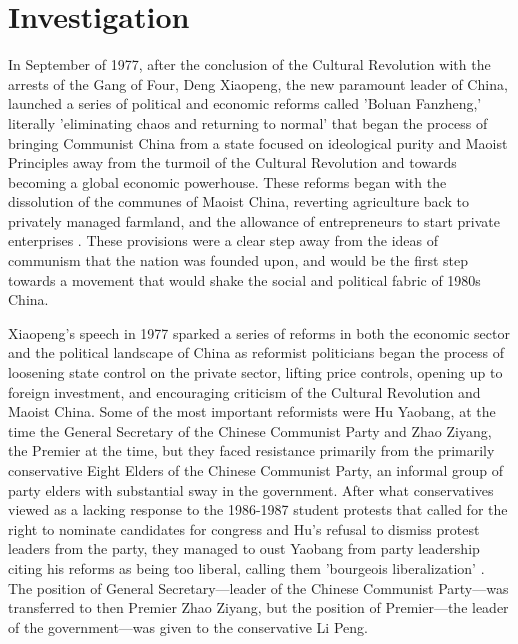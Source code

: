 \documentclass{paper}
\begin{document}
\section{Investigation}
In September of 1977, after the conclusion of the Cultural Revolution with the arrests of the Gang of Four, Deng Xiaopeng, the new paramount leader of China, launched a series of political and economic reforms called 'Boluan Fanzheng,' literally 'eliminating chaos and returning to normal' that began the process of bringing Communist China from a state focused on ideological purity and Maoist Principles away from the turmoil of the Cultural Revolution and towards becoming a global economic powerhouse. These reforms began with the dissolution of the communes of Maoist China, reverting agriculture back to privately managed farmland, and the allowance of entrepreneurs to start private enterprises \cite{reforms}. These provisions were a clear step away from the ideas of communism that the nation was founded upon, and would be the first step towards a movement that would shake the social and political fabric of 1980s China.

Xiaopeng's speech in 1977 sparked a series of reforms in both the economic sector and the political landscape of China as reformist politicians began the process of loosening state control on the private sector, lifting price controls, opening up to foreign investment, and encouraging criticism of the Cultural Revolution and Maoist China. Some of the most important reformists were Hu Yaobang, at the time the General Secretary of the Chinese Communist Party and Zhao Ziyang, the Premier at the time, but they faced resistance primarily from the primarily conservative Eight Elders of the Chinese Communist Party, an informal group of party elders with substantial sway in the government. After what conservatives viewed as a lacking response to the 1986-1987 student protests that called for the right to nominate candidates for congress and Hu's refusal to dismiss protest leaders from the party, they managed to oust Yaobang from party leadership citing his reforms as being too liberal, calling them 'bourgeois liberalization' \cite{deng}. The position of General Secretary---leader of the Chinese Communist Party---was transferred to then Premier Zhao Ziyang, but the position of Premier---the leader of the government---was given to the conservative Li Peng.
\end{document}

